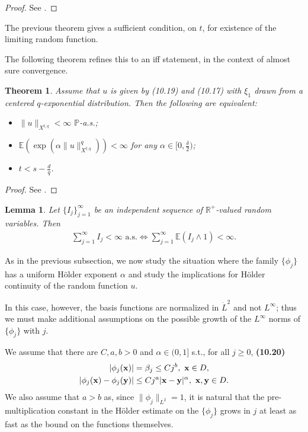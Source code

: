 \documentclass[oneside,11pt]{book}
\numberwithin{equation}{section}
\newtheorem{lemma}{Lemma}[section]
\newtheorem{theorem}{Theorem}[section]
\begin{document}
\begin{proof}
    See \cite[p. 326]{Dashti_Stuart2017}.
\end{proof}
The previous theorem gives a sufficient condition, on $t$, for existence of the limiting random function.

The following theorem refines this to an iff statement, in the context of almost sure convergence.

\begin{theorem}
    Assume that $u$ is given by (10.19) and (10.17) with $\xi_1$ drawn from a centered $q$-exponential distribution. Then the following are equivalent:
    \begin{itemize}
        \item[(i)] $\|u\|_{X^{t,q}} < \infty$ $\mathbb{P}$-a.s.;
        \item[(ii)] $\mathbb{E}(\exp(\alpha\|u\|_{X^{t,q}}^q)) < \infty$ for any $\alpha\in[0,\frac{\delta}{2})$;
        \item[(iii)] $t < s - \frac{d}{q}$.
    \end{itemize}
\end{theorem}

\begin{proof}
    See \cite[pp. 326--328]{Dashti_Stuart2017}.
\end{proof}

\begin{lemma}
    Let $\{I_j\}_{j=1}^\infty$ be an independent sequence of $\mathbb{R}^+$-valued random variables. Then
    \begin{align*}
        \sum_{j=1}^\infty I_j < \infty \mbox{ a.s.}\Leftrightarrow\sum_{j=1}^\infty \mathbb{E}(I_j\wedge 1) < \infty.
    \end{align*}
\end{lemma}
As in the previous subsection, we now study the situation where the family $\{\phi_j\}$ has a uniform H\"older exponent $\alpha$ and study the implications for H\"older continuity of the random function $u$.

In this case, however, the basis functions are normalized in $\dot{L}^2$ and not $L^\infty$; thus we must make additional assumptions on the possible growth of the $L^\infty$ norms of $\{\phi_j\}$ with $j$.

We assume that there are $C,a,b > 0$ and $\alpha\in(0,1]$ s.t., for all $j\ge 0$, \textbf{(10.20)}
\begin{align*}
    |\phi_j({\bf x})| &= \beta_j\le Cj^b,\ {\bf x}\in D,\\
    |\phi_j({\bf x}) - \phi_j({\bf y})|&\le Cj^a|{\bf x} - {\bf y}|^\alpha,\ {\bf x},{\bf y}\in D.
\end{align*}
We also assume that $a > b$ as, since $\|\phi_j\|_{L^2} = 1$, it is natural that the pre-multiplication constant in the H\"older estimate on the $\{\phi_j\}$ grows in $j$ at least as fast as the bound on the functions themselves.
\end{document}
